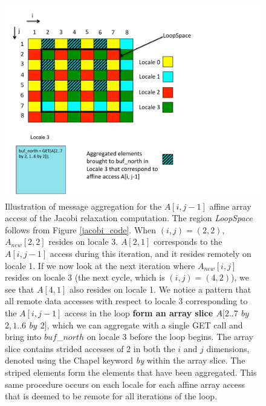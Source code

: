 \begin{figure}
\begin{center}
\includegraphics[scale=0.53]{./Figures/aggregation}
\caption{Illustration of message aggregation for the $A[i, j-1]$ affine array access of the Jacobi relaxation computation. The region \textit{LoopSpace} follows from Figure \ref{jacobi_code}. When $(i, j) = (2, 2)$, $A_{new}[2, 2]$ resides on locale 3. $A[2, 1]$ corresponds to the $A[i, j-1]$ access during this iteration, and it resides remotely on locale 1. If we now look at the next iteration where $A_{new}[i, j]$ resides on locale 3 (the next cycle, which is $(i, j) = (4, 2)$), we see that $A[4, 1]$ also resides on locale 1. We notice a pattern that all remote data accesses with respect to locale 3 corresponding to the $A[i, j-1]$ access in the loop \textbf{form an array slice $A[2..7$ $by$ $2, 1..6$ $by$ $2]$}, which we can aggregate with a single GET call and bring into $buf$\_$north$ on locale 3 before the loop begins. The array slice contains strided accesses of 2 in both the $i$ and $j$ dimensions, denoted using the Chapel keyword \textit{by} within the array slice. The striped elements form the elements that have been aggregated. This same procedure occurs on each locale for each affine array access that is deemed to be remote for all iterations of the loop.}
\label{aggregation}
\end{center}
\end{figure}


